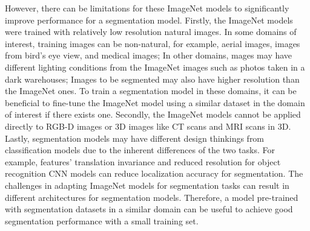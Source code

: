 

However, there can be limitations for these ImageNet models to significantly improve performance for a segmentation model.
Firstly, the ImageNet models were trained with relatively low resolution natural images.
In some domains of interest, training images can be non-natural, for example, aerial images, images from bird's eye view, and medical images;
In other domains, mages may have different lighting conditions from the ImageNet images such as photos taken in a dark warehouses;
Images to be segmented may also have higher resolution than the ImageNet ones.
To train a segmentation model in these domains, it can be beneficial to fine-tune the ImageNet model using a similar dataset in the domain of interest if there exists one.
Secondly, the ImageNet models cannot be applied directly to RGB-D images or 3D images like CT scans and MRI scans in 3D.
Lastly, segmentation models may have different design thinkings from classification models due to the inherent differences of the two tasks.
For example, features' translation invariance and reduced resolution for object recognition CNN models can reduce localization accuracy for segmentation.\cite{zheng2015conditional,chen2016deeplab}
The challenges in adapting ImageNet models for segmentation tasks can result in different architectures for segmentation models\cite{zheng2015conditional}.
Therefore, a model pre-trained with segmentation datasets in a similar domain can be useful to achieve good segmentation performance with a small training set.





